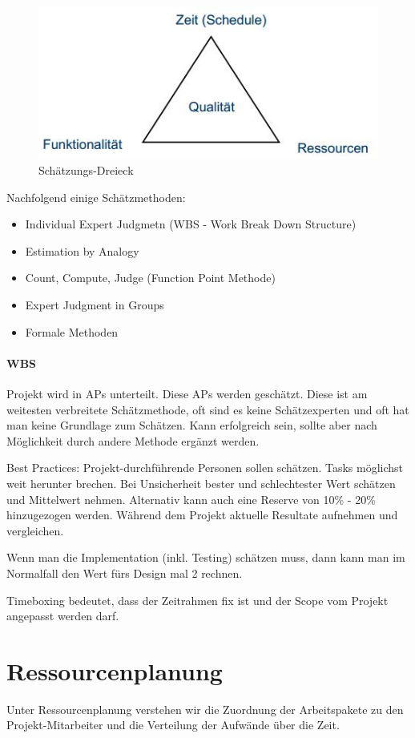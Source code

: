 \begin{figure}[h!]
\centering
\includegraphics[width=0.3\linewidth]{fig/schaetzung-dreieck}
\caption{Schätzungs-Dreieck}
\label{fig:schaetzung-dreieck}
\end{figure}

Nachfolgend einige Schätzmethoden:
\begin{itemize}
	\item Individual Expert Judgmetn (WBS - Work Break Down Structure)
	\item Estimation by Analogy
	\item Count, Compute, Judge (Function Point Methode)
	\item Expert Judgment in Groups
	\item Formale Methoden
\end{itemize}

\paragraph{WBS} Projekt wird in APs unterteilt. Diese APs werden geschätzt. Diese ist am weitesten verbreitete Schätzmethode, oft sind es keine Schätzexperten und oft hat man keine Grundlage zum Schätzen. Kann erfolgreich sein, sollte aber nach Möglichkeit durch andere Methode ergänzt werden.

Best Practices: Projekt-durchführende Personen sollen schätzen. Tasks möglichst weit herunter brechen. Bei Unsicherheit bester und schlechtester Wert schätzen und Mittelwert nehmen. Alternativ kann auch eine Reserve von 10\% - 20\% hinzugezogen werden. Während dem Projekt aktuelle Resultate aufnehmen und vergleichen.

Wenn man die Implementation (inkl. Testing) schätzen muss, dann kann man im Normalfall den Wert fürs Design mal 2 rechnen.

Timeboxing bedeutet, dass der Zeitrahmen fix ist und der Scope vom Projekt angepasst werden darf.

\section{Ressourcenplanung}
\label{sec:ressourcenplanung}
Unter Ressourcenplanung verstehen wir die Zuordnung der Arbeitspakete zu den Projekt-Mitarbeiter und die Verteilung der Aufwände über die Zeit.

